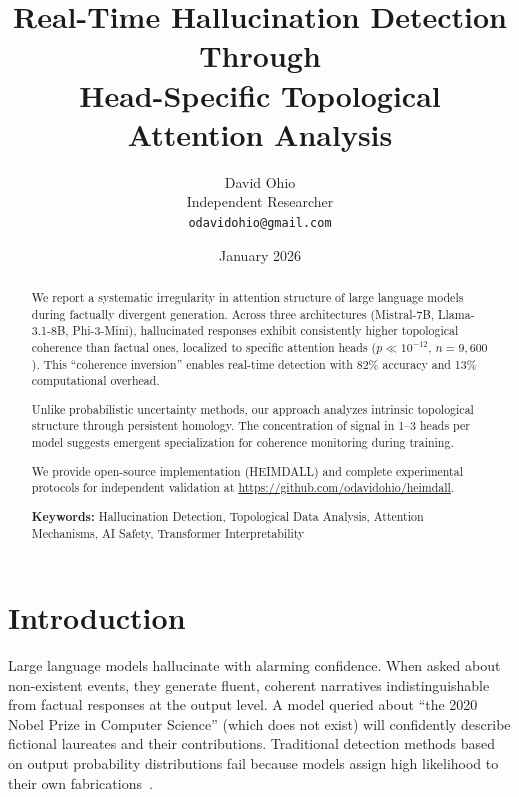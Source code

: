 \documentclass[11pt,twocolumn]{article}
\title{\Large \textbf{Real-Time Hallucination Detection Through \\
Head-Specific Topological Attention Analysis}}
\author{
    David Ohio \\
    Independent Researcher \\
    \texttt{odavidohio@gmail.com}
}
\date{January 2026}
\begin{document}
\maketitle

\begin{abstract}
We report a systematic irregularity in attention structure of large language models during factually divergent generation. Across three architectures (Mistral-7B, Llama-3.1-8B, Phi-3-Mini), hallucinated responses exhibit consistently higher topological coherence than factual ones, localized to specific attention heads ($p \ll 10^{-12}$, $n=9{,}600$). This ``coherence inversion'' enables real-time detection with 82\% accuracy and 13\% computational overhead.

Unlike probabilistic uncertainty methods, our approach analyzes intrinsic topological structure through persistent homology. The concentration of signal in 1--3 heads per model suggests emergent specialization for coherence monitoring during training.

We provide open-source implementation (HEIMDALL) and complete experimental protocols for independent validation at \url{https://github.com/odavidohio/heimdall}.

\textbf{Keywords:} Hallucination Detection, Topological Data Analysis, Attention Mechanisms, AI Safety, Transformer Interpretability
\end{abstract}

\section{Introduction}

Large language models hallucinate with alarming confidence. When asked about non-existent events, they generate fluent, coherent narratives indistinguishable from factual responses at the output level. A model queried about ``the 2020 Nobel Prize in Computer Science'' (which does not exist) will confidently describe fictional laureates and their contributions. Traditional detection methods based on output probability distributions fail because models assign high likelihood to their own fabrications~\cite{ji2023hallucination,maynez2020faithfulness}.
\end{document}
